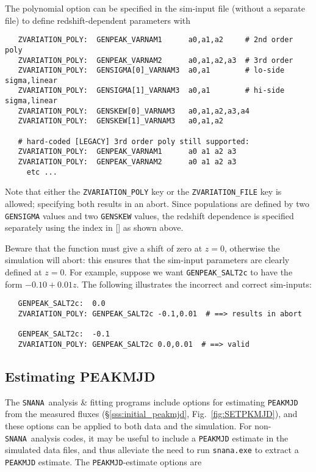 \documentclass[12pt]{article}
\newcommand{\SNANA}{{\tt SNANA}}
\begin{document}
\bigskip
The polynomial option can be specified in the sim-input file
(without a separate file) to define redshift-dependent parameters
with
%
\begin{verbatim}
   ZVARIATION_POLY:  GENPEAK_VARNAM1      a0,a1,a2     # 2nd order poly
   ZVARIATION_POLY:  GENPEAK_VARNAM2      a0,a1,a2,a3  # 3rd order
   ZVARIATION_POLY:  GENSIGMA[0]_VARNAM3  a0,a1        # lo-side sigma,linear
   ZVARIATION_POLY:  GENSIGMA[1]_VARNAM3  a0,a1        # hi-side sigma,linear
   ZVARIATION_POLY:  GENSKEW[0]_VARNAM3   a0,a1,a2,a3,a4
   ZVARIATION_POLY:  GENSKEW[1]_VARNAM3   a0,a1,a2

   # hard-coded [LEGACY] 3rd order poly still supported: 
   ZVARIATION_POLY:  GENPEAK_VARNAM1      a0 a1 a2 a3
   ZVARIATION_POLY:  GENPEAK_VARNAM2      a0 a1 a2 a3
     etc ...
\end{verbatim}


Note that either the {\tt ZVARIATION\_POLY} key or the 
{\tt ZVARIATION\_FILE} key is allowed; 
specifying both results in an abort.
Since populations are defined by two {\tt GENSIGMA} values
and two {\tt GENSKEW} values,
the redshift dependence is specified separately 
using the index in [] as shown above. 


Beware that the function must give a shift of zero at $z=0$,
otherwise the simulation will abort: this ensures 
that the sim-input parameters are clearly defined at $z=0$.
For example, suppose we want {\tt GENPEAK\_SALT2c} to have
the form $-0.10+0.01z$. The following illustrates
the incorrect and correct sim-inputs:
\begin{verbatim}
   GENPEAK_SALT2c:  0.0
   ZVARIATION_POLY: GENPEAK_SALT2c -0.1,0.01  # ==> results in abort

   GENPEAK_SALT2c:  -0.1
   ZVARIATION_POLY: GENPEAK_SALT2c 0.0,0.01  # ==> valid
\end{verbatim}


   \subsection{Estimating PEAKMJD}
   \label{subsec:SETPKMJD}

The \SNANA\ analysis \& fitting programs include options for 
estimating {\tt PEAKMJD} from the measured fluxes
(\S\ref{sss:initial_peakmjd}, Fig.~\ref{fig:SETPKMJD}), 
and these options can be applied to both data and the simulation.
For non-\SNANA\ analysis codes, it may be useful to include
a {\tt PEAKMJD} estimate in the simulated data files,
and thus alleviate the need to run {\tt snana.exe} to extract
a {\tt PEAKMJD} estimate. The {\tt PEAKMJD}-estimate options are
\end{document}
